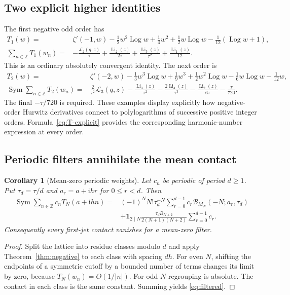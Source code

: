 \documentclass[11pt,a4paper]{article}
\numberwithin{equation}{section}
\newtheorem{corollary}[theorem]{Corollary}
\theoremstyle{definition}
\theoremstyle{remark}
\DeclareMathOperator{\Li}{Li}
\DeclareMathOperator{\Log}{Log}
\DeclareMathOperator{\Sym}{Sym}
\newcommand{\ii}{\mathrm i}
\newcommand{\Z}{\mathbb Z}
\newcommand{\Bcal}{\mathcal B}
\newcommand{\Lcal}{\mathcal L}
\begin{document}
\subsection{Two explicit higher identities}
The first negative odd order has
\begin{align}
 T_1(w)={}&\zeta'(-1,w)-\tfrac12w^2\Log w+\tfrac14w^2
                 +\tfrac12w\Log w-\tfrac1{12}(\Log w+1),\label{eq:T1}\\
 \sum_{n\in\Z}T_1(w_n)
   ={}&-\frac{\Lcal_2(q,z)}\tau+\frac{\Li_2(z)}{2\tau}
                    +\frac{\Li_3(z)}{\tau^2}+\frac{\Li_1(z)}{12}.
 \label{eq:T1-sum}
\end{align}
This is an ordinary absolutely convergent identity. The next order is
\begin{align}
 T_2(w)={}&\zeta'(-2,w)-\tfrac13w^3\Log w+\tfrac19w^3
               +\tfrac12w^2\Log w-\tfrac16w\Log w-\tfrac1{12}w,
 \label{eq:T2}\\
 \Sym\sum_{n\in\Z}T_2(w_n)
   ={}&\frac{2}{\tau^2}\Lcal_3(q,z)-\frac{\Li_3(z)}{\tau^2}
             -\frac{2\Li_4(z)}{\tau^3}-\frac{\Li_2(z)}{6\tau}
             -\frac\tau{720}.
 \label{eq:T2-sum}
\end{align}
The final $-\tau/720$ is required. These examples display explicitly
how negative-order Hurwitz derivatives connect to polylogarithms of
successive positive integer orders. Formula~\eqref{eq:T-explicit}
provides the corresponding harmonic-number expression at every order.

\subsection{Periodic filters annihilate the mean contact}
\begin{corollary}[Mean-zero periodic weights]\label{cor:filters}
Let $c_n$ be periodic of period $d\ge1$. Put
$\tau_d=\tau/d$ and $a_r=a+\ii hr$ for $0\le r<d$. Then
\begin{equation}\label{eq:filtered}
 \begin{split}
 \Sym\sum_{n\in\Z}c_n T_N(a+\ii hn)
 ={}&(-1)^N N!\tau_d^{-N}
       \sum_{r=0}^{d-1}c_r\Bcal_{M_N}(-N;a_r,\tau_d)\\
 &+\mathbf1_{2\mid N}\frac{\tau_d B_{N+2}}{2(N+1)(N+2)}
                  \sum_{r=0}^{d-1}c_r.
 \end{split}
\end{equation}
Consequently every first-jet contact vanishes for a mean-zero filter.
\end{corollary}
\begin{proof}
Split the lattice into residue classes modulo $d$ and apply
Theorem~\ref{thm:negative} to each class with spacing $dh$.
For even $N$, shifting the endpoints of a symmetric cutoff by a
bounded number of terms changes its limit by zero, because
$T_N(w_n)=O(1/|n|)$. For odd $N$ regrouping is absolute.
The contact in each class is the same constant. Summing yields
\eqref{eq:filtered}.
\end{proof}
\end{document}
